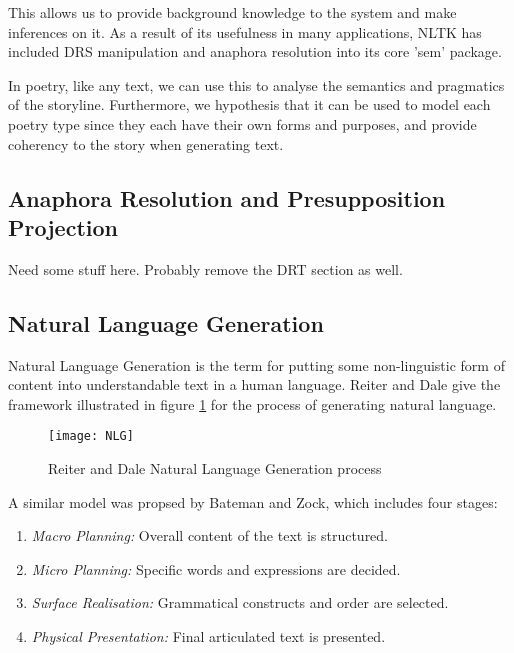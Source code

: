 This allows us to provide background knowledge to the system and make inferences on it. As a result of its usefulness in many applications, NLTK has included DRS manipulation and anaphora resolution into its core 'sem' package. 

In poetry, like any text, we can use this to analyse the semantics and pragmatics of the storyline. Furthermore, we hypothesis that it can be used to model each poetry type since they each have their own forms and purposes, and provide coherency to the story when generating text.

\subsection{Anaphora Resolution and Presupposition Projection}
\label{sec:arback}

Need some stuff here. Probably remove the DRT section as well.

\subsection{Natural Language Generation}
Natural Language Generation is the term for putting some non-linguistic form of content into understandable text in a human language. Reiter and Dale give the framework\cite{reiter2000building} illustrated in figure \ref{fig:nlg} for the process of generating natural language.

\begin{figure}[h!]
\centering
\texttt{[image: NLG]}
\caption{Reiter and Dale Natural Language Generation process}
\label{fig:nlg}
\end{figure}

A similar model was propsed by Bateman and Zock\cite{mitkov2003oxford}, which includes four stages:
\begin{enumerate}
\item{\textit{Macro Planning:} Overall content of the text is structured.}
\item{\textit{Micro Planning:} Specific words and expressions are decided.}
\item{\textit{Surface Realisation:} Grammatical constructs and order are selected.}
\item{\textit{Physical Presentation:} Final articulated text is presented.}
\end{enumerate}

